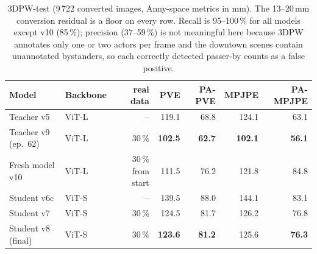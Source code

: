 
\begin{table}[h]
\centering\small
\begin{tabular}{llrrrrr}
\toprule
Model & Backbone & real data & PVE & PA-PVE & MPJPE & PA-MPJPE \\
\midrule
Teacher v5 & ViT-L & -- & 119.1 & 68.8 & 124.1 & 63.1 \\
Teacher v9 (ep.\ 62) & ViT-L & 30\,\% & \textbf{102.5} & \textbf{62.7} & \textbf{102.1} & \textbf{56.1} \\
Fresh model v10 & ViT-L & 30\,\% from start & 111.5 & 76.2 & 121.8 & 84.8 \\
Student v6c & ViT-S & -- & 139.5 & 88.0 & 144.1 & 83.1 \\
Student v7 & ViT-S & 30\,\% & 124.5 & 81.7 & 126.2 & 76.8 \\
Student v8 (final) & ViT-S & 30\,\% & \textbf{123.6} & \textbf{81.2} & 125.6 & \textbf{76.3} \\
\bottomrule
\end{tabular}
\caption{3DPW-test (9\,722 converted images, Anny-space metrics in mm). The
13--20\,mm conversion residual is a floor on every row. Recall is 95--100\,\%
for all models except v10 (85\,\%); precision (37--59\,\%) is not meaningful here because 3DPW
annotates only one or two actors per frame and the downtown scenes contain
unannotated bystanders, so each correctly detected passer-by counts as a false
positive.}
\label{tab:test3dpw}
\end{table}
